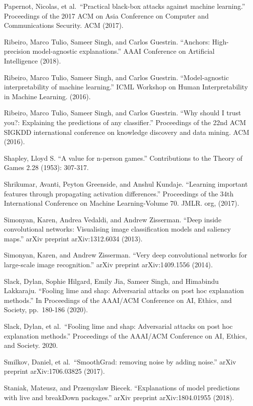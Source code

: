 \documentclass[
  11pt,
]{scrbook}
\begin{document}
Papernot, Nicolas, et al.~``Practical black-box attacks against machine learning.'' Proceedings of the 2017 ACM on Asia Conference on Computer and Communications Security. ACM (2017).

Ribeiro, Marco Tulio, Sameer Singh, and Carlos Guestrin. ``Anchors: High-precision model-agnostic explanations.'' AAAI Conference on Artificial Intelligence (2018).

Ribeiro, Marco Tulio, Sameer Singh, and Carlos Guestrin. ``Model-agnostic interpretability of machine learning.'' ICML Workshop on Human Interpretability in Machine Learning. (2016).

Ribeiro, Marco Tulio, Sameer Singh, and Carlos Guestrin. ``Why should I trust you?: Explaining the predictions of any classifier.'' Proceedings of the 22nd ACM SIGKDD international conference on knowledge discovery and data mining. ACM (2016).

Shapley, Lloyd S. ``A value for n-person games.'' Contributions to the Theory of Games 2.28 (1953): 307-317.

Shrikumar, Avanti, Peyton Greenside, and Anshul Kundaje. ``Learning important features through propagating activation differences.'' Proceedings of the 34th International Conference on Machine Learning-Volume 70. JMLR. org, (2017).

Simonyan, Karen, Andrea Vedaldi, and Andrew Zisserman. ``Deep inside convolutional networks: Visualising image classification models and saliency maps.'' arXiv preprint arXiv:1312.6034 (2013).

Simonyan, Karen, and Andrew Zisserman. ``Very deep convolutional networks for large-scale image recognition.'' arXiv preprint arXiv:1409.1556 (2014).

Slack, Dylan, Sophie Hilgard, Emily Jia, Sameer Singh, and Himabindu Lakkaraju. ``Fooling lime and shap: Adversarial attacks on post hoc explanation methods.'' In Proceedings of the AAAI/ACM Conference on AI, Ethics, and Society, pp.~180-186 (2020).

Slack, Dylan, et al.~``Fooling lime and shap: Adversarial attacks on post hoc explanation methods.'' Proceedings of the AAAI/ACM Conference on AI, Ethics, and Society. 2020.

Smilkov, Daniel, et al.~``SmoothGrad: removing noise by adding noise.'' arXiv preprint arXiv:1706.03825 (2017).

Staniak, Mateusz, and Przemyslaw Biecek. ``Explanations of model predictions with live and breakDown packages.'' arXiv preprint arXiv:1804.01955 (2018).
\end{document}
